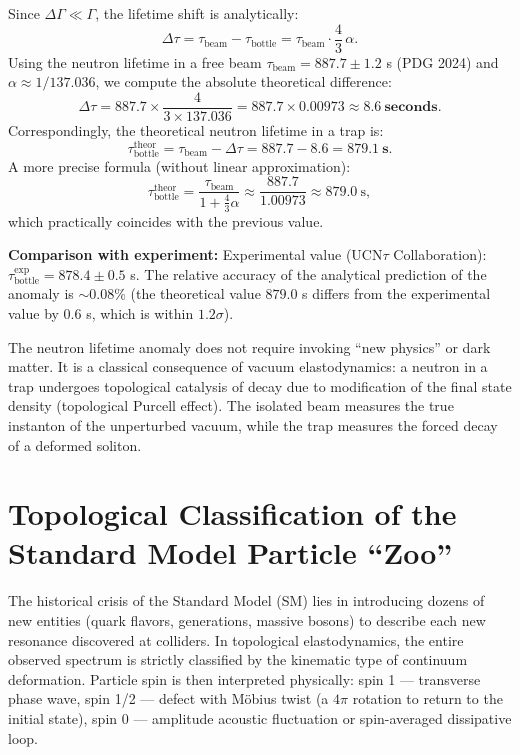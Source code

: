 \documentclass[11pt,a4paper]{article}
\begin{document}
Since $\Delta \Gamma \ll \Gamma$, the lifetime shift is analytically:
\begin{equation}
\Delta \tau = \tau_{\text{beam}} - \tau_{\text{bottle}} = \tau_{\text{beam}} \cdot \frac{4}{3}\,\alpha.
\end{equation}
Using the neutron lifetime in a free beam $\tau_{\text{beam}} = 887.7 \pm 1.2$ s (PDG 2024) and $\alpha \approx 1/137.036$, we compute the absolute theoretical difference:
\begin{equation}
\Delta \tau = 887.7 \times \frac{4}{3 \times 137.036} = 887.7 \times 0.00973 \approx \mathbf{8.6\ \text{seconds}}.
\end{equation}
Correspondingly, the theoretical neutron lifetime in a trap is:
\begin{equation}
\tau_{\text{bottle}}^{\text{theor}} = \tau_{\text{beam}} - \Delta\tau = 887.7 - 8.6 = \mathbf{879.1\ \text{s}}.
\end{equation}
A more precise formula (without linear approximation):
\begin{equation}
\tau_{\text{bottle}}^{\text{theor}} = \frac{\tau_{\text{beam}}}{1 + \frac{4}{3}\alpha} \approx \frac{887.7}{1.00973} \approx 879.0\ \text{s},
\end{equation}
which practically coincides with the previous value.

\textbf{Comparison with experiment:}
Experimental value (UCN$\tau$ Collaboration): $\tau_{\text{bottle}}^{\text{exp}} = 878.4 \pm 0.5$ s. The relative accuracy of the analytical prediction of the anomaly is $\sim 0.08\%$ (the theoretical value $879.0$ s differs from the experimental value by $0.6$ s, which is within $1.2\sigma$).

The neutron lifetime anomaly does not require invoking ``new physics'' or dark matter. It is a classical consequence of vacuum elastodynamics: a neutron in a trap undergoes topological catalysis of decay due to modification of the final state density (topological Purcell effect). The isolated beam measures the true instanton of the unperturbed vacuum, while the trap measures the forced decay of a deformed soliton.

\section{Topological Classification of the Standard Model Particle ``Zoo''}

The historical crisis of the Standard Model (SM) lies in introducing dozens of new entities (quark flavors, generations, massive bosons) to describe each new resonance discovered at colliders. In topological elastodynamics, the entire observed spectrum is strictly classified by the kinematic type of continuum deformation. Particle spin is then interpreted physically: spin 1 — transverse phase wave, spin 1/2 — defect with Möbius twist (a $4\pi$ rotation to return to the initial state), spin 0 — amplitude acoustic fluctuation or spin-averaged dissipative loop.
\end{document}
